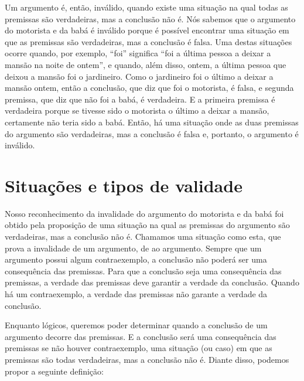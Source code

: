 Um argumento é, então, inválido, quando existe uma  situação na qual todas as premissas são verdadeiras, mas a conclusão não é.
Nós sabemos que o argumento do motorista e da babá é inválido porque é possível encontrar uma situação em que as premissas são verdadeiras, mas a conclusão é falsa.
Uma destas situações ocorre quando, por exemplo, ``foi'' significa ``foi a última pessoa a deixar a mansão na noite de ontem'', e quando, além disso, ontem, a última pessoa que deixou a mansão foi o jardineiro.
Como o jardineiro foi o último a deixar a mansão ontem, então a conclusão, que diz que foi o motorista, é falsa, e segunda premissa, que diz que não foi a babá, é verdadeira.
E a primeira premissa é verdadeira porque se tivesse sido o motorista o último a deixar a mansão, certamente não teria sido a babá.
Então, há uma situação onde as duas premissas do argumento são verdadeiras, mas a conclusão é falsa e, portanto, o argumento é inválido.

















\section{Situações e tipos de validade}
\label{ss:Validade}

Nosso reconhecimento da invalidade do argumento do motorista e da babá foi obtido pela proposição de uma situação na qual as premissas do argumento são verdadeiras, mas a conclusão não é.
Chamamos uma situação como esta, que prova a invalidade de um argumento, de  ao argumento.
Sempre que um argumento possui algum contraexemplo, a conclusão não poderá ser uma consequência das premissas.
Para que a conclusão seja uma consequência das premissas, a verdade das premissas deve garantir a verdade da conclusão. Quando há um contraexemplo, a verdade das premissas não garante a verdade da conclusão.

Enquanto lógicos, queremos poder determinar quando a conclusão de um argumento decorre das premissas.
E a conclusão será uma consequência das premissas se não houver contraexemplo, uma situação (ou caso) em que as premissas são todas verdadeiras, mas a conclusão não é.
Diante disso, podemos propor a seguinte definição:

